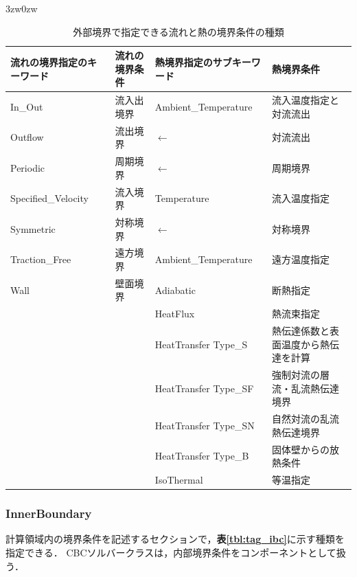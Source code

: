 \begin{indentation}{3zw}{0zw}

\begin{table}[htdp]
\caption{外部境界で指定できる流れと熱の境界条件の種類}
\begin{center}
\small
\begin{tabular}{ll|ll} \toprule
流れの境界指定のキーワード &  流れの境界条件 & 熱境界指定のサブキーワード & 熱境界条件\\ \midrule
In\_Out & 流入出境界 & Ambient\_Temperature & 流入温度指定と対流流出\\
Outflow & 流出境界 & $\leftarrow$ & 対流流出\\
Periodic & 周期境界 & $\leftarrow$ & 周期境界\\
Specified\_Velocity & 流入境界 & Temperature & 流入温度指定\\
Symmetric & 対称境界 & $\leftarrow$ & 対称境界\\
Traction\_Free & 遠方境界 & Ambient\_Temperature & 遠方温度指定\\ \hline
Wall & 壁面境界 & Adiabatic & 断熱指定\\
& & HeatFlux & 熱流束指定\\ 
& & HeatTransfer Type\_S & 熱伝達係数と表面温度から熱伝達を計算\\
& & HeatTransfer Type\_SF & 強制対流の層流・乱流熱伝達境界\\
& & HeatTransfer Type\_SN & 自然対流の乱流熱伝達境界\\
& & HeatTransfer Type\_B & 固体壁からの放熱条件\\
& & IsoThermal & 等温指定\\
\bottomrule
\end{tabular}
\end{center}
\label{tbl:outer BC physical}
\end{table}

\end{indentation}

\pagebreak
%
\subsubsection{InnerBoundary}
計算領域内の境界条件を記述するセクションで，\textbf{表\ref{tbl:tag_ibc}}に示す種類を指定できる．
CBCソルバークラスは，内部境界条件をコンポーネントとして扱う．


